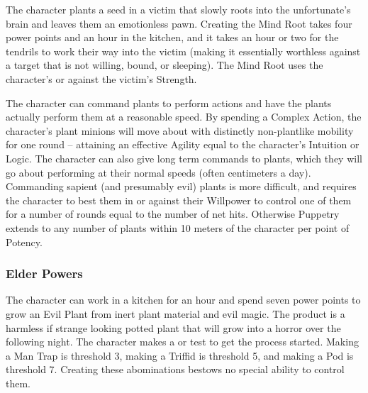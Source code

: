  The character plants a seed in a victim that slowly roots into the unfortunate's brain and leaves them an emotionless pawn. Creating the Mind Root takes four power points and an hour in the kitchen, and it takes an hour or two for the tendrils to work their way into the victim (making it essentially worthless against a target that is not willing, bound, or sleeping). The Mind Root uses the character's  or  against the victim's Strength.

 The character can command plants to perform actions and have the plants actually perform them at a reasonable speed. By spending a Complex Action, the character's plant minions will move about with distinctly non-plantlike mobility for one round -- attaining an effective Agility equal to the character's Intuition or Logic. The character can also give long term commands to plants, which they will go about performing at their normal speeds (often centimeters a day). Commanding sapient (and presumably evil) plants is more difficult, and requires the character to best them in  or  against their Willpower to control one of them for a number of rounds equal to the number of net hits. Otherwise Puppetry extends to any number of plants within 10 meters of the character per point of Potency.


\subsubsection{Elder Powers}

 The character can work in a kitchen for an hour and spend seven power points to grow an Evil Plant from inert plant material and evil magic. The product is a harmless if strange looking potted plant that will grow into a horror over the following night. The character makes a  or  test to get the process started. Making a Man Trap is threshold 3, making a Triffid is threshold 5, and making a Pod is threshold 7. Creating these abominations bestows no special ability to control them. 

